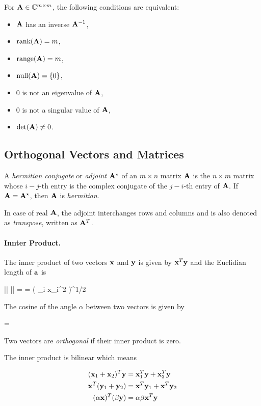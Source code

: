 \begin{theorem}
  For $\mathbf{A} \in \mathbb{C}^{m \times m}$, the following conditions are equivalent:

  \begin{itemize}
  \item $\mathbf{A}$ has an inverse $\mathbf{A}^{-1}$,
  \item $\text{rank}(\mathbf{A}) = m$,
  \item $\text{range}(\mathbf{A}) = m$,
  \item $\text{null}(\mathbf{A}) = \{0\}$,
  \item $0$ is not an eigenvalue of $\mathbf{A}$,
  \item $0$ is not a singular value of $\mathbf{A}$,
  \item $\det(\mathbf{A}) \neq 0$.
\end{itemize}
\end{theorem}

\subsection{Orthogonal Vectors and Matrices}

A \emph{hermitian conjugate} or \emph{adjoint} $\mathbf{A}^\star$ of an $m \times n$ matrix $\mathbf{A}$ is the $n \times m$ matrix whose $i-j$-th entry is the complex conjugate of the $j-i$-th entry of $\mathbf{A}$. If $\mathbf{A} = \mathbf{A}^\star$, then $\mathbf{A}$ is \emph{hermitian}.

In case of real $\mathbf{A}$, the adjoint interchanges rows and columns and is also denoted as \emph{transpose}, written as $\mathbf{A}^T$. 

\paragraph{Innter Product.} The inner product of two vectors $\mathbf{x}$ and $\mathbf{y}$ is given by $\mathbf{x}^T \mathbf{y}$ and the Euclidian length of $\mathbf{a}$ is

\bee
|| \xbf || =  = \left( \sum_i x_i^2 \right)^{1/2}
\eee

The cosine of the angle $\alpha$ between two vectors is given by

\bee
\cos \alpha = 
\eee

Two vectors are \emph{orthogonal} if their inner product is zero.

The inner product is bilinear which means

\begin{align*}
  (\mathbf{x}_1 + \mathbf{x}_2)^T \mathbf{y} &= \mathbf{x}_1^T \mathbf{y} + \mathbf{x}_2^T \mathbf{y} \\
  \mathbf{x}^T(\mathbf{y}_1 + \mathbf{y}_2) &= \mathbf{x}^T \mathbf{y}_1 + \mathbf{x}^T \mathbf{y}_2 \\
  (\alpha \mathbf{x})^T (\beta \mathbf{y}) &= \alpha \beta \mathbf{x}^T \mathbf{y}
\end{align*}


